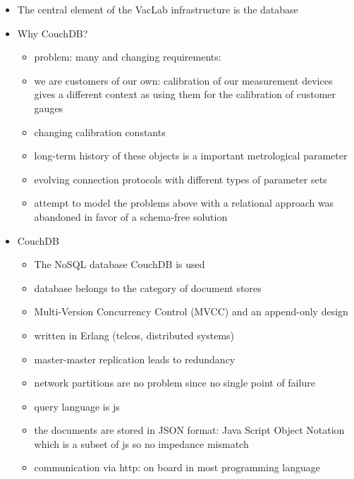 \documentclass[3p,times,procedia]{elsarticle}
\begin{document}
\begin{itemize}
\item The central element of the VacLab infrastructure is the database
\item Why CouchDB?
  \begin{itemize}
  \item problem: many and changing requirements:
  \item we are customers of our own: calibration of our measurement
    devices gives a different context as using them
    for the calibration of customer gauges 
  \item changing calibration constants
  \item long-term history of these objects is a important metrological parameter
  \item evolving connection protocols with different
    types of parameter sets 
  \item attempt to model the problems above with a relational approach
    was abandoned in favor of a schema-free solution
\end{itemize}
\item CouchDB
  \begin{itemize}
  \item The NoSQL database CouchDB \cite{couch} is used
  \item database belongs to the category of document stores
  \item Multi-Version Concurrency Control (MVCC) and an append-only design
  \item written in Erlang (telcos, distributed systems)
  \item master-master replication leads to redundancy 
  \item network partitions are no problem since no single point of failure
  \item query language is js
  \item the documents are stored in JSON format: Java Script Object
    Notation which is a subset of js so no impedance mismatch
  \item communication via http: on board in most programming language
  \end{itemize}
  

\end{itemize}
\end{document}
